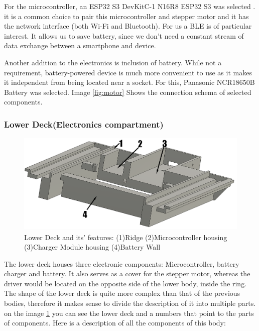 For the microcontroller, an ESP32 S3 DevKitC-1 N16R8 ESP32 S3 was selected \cite{microcontroller}. it is a common choice to pair this microcontroller and stepper motor and it has the network interface (both Wi-Fi and Bluetooth). For us a \ac{BLE} is of particular interest. It allows us to save battery, since we don't need a constant stream of data exchange between a smartphone and device.

Another addition to the electronics is inclusion of battery. While not a requirement, battery-powered device is much more convenient to use as it makes it independent from being located near a socket. For this, Panasonic NCR18650B \cite{panasonic_ncr18650b} Battery was selected. Image \ref{fig:motor} Shows the connection schema of selected components.
\newpage
\subsubsection{Lower Deck(Electronics compartment)}
\begin{figure}[h]
	\centering
	\includegraphics[width=0.7\linewidth]{Figures/Screenshot_13}
	\caption[Lower Deck]{Lower Deck and its' features: (1)Ridge (2)Microcontroller housing (3)Charger Module housing (4)Battery Wall}
	\label{fig:screenshot13}
\end{figure}
The lower deck houses three electronic components: Microcontroller, battery charger and battery. It also serves as a cover for the stepper motor, whereas the driver would be located on the opposite side of the lower body, inside the ring. The shape of the lower deck is quite more complex than that of the previous bodies, therefore it makes sense to divide the description of it into multiple parts. on the image \ref{fig:screenshot13} you can see the lower deck and a numbers that point to the parts of components. Here is a description of all the components of this body:
